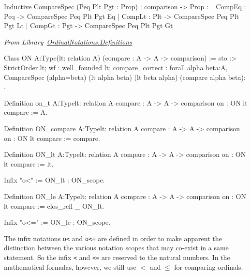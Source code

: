 \begin{Coqsrc}
Inductive CompareSpec (Peq Plt Pgt : Prop) : comparison -> Prop :=
    CompEq : Peq -> CompareSpec Peq Plt Pgt Eq
  | CompLt : Plt -> CompareSpec Peq Plt Pgt Lt
  | CompGt : Pgt -> CompareSpec Peq Plt Pgt Gt
\end{Coqsrc}

\vspace{4pt}
\noindent\emph{From Library~\href{../theories/html/hydras.OrdinalNotations.Definitions.html}{OrdinalNotations.Definitions}}

\label{types:ON}

\begin{Coqsrc}
Class ON {A:Type}(lt: relation A)
      (compare : A -> A -> comparison)  :=
  {
  sto :> StrictOrder lt;
  wf : well_founded lt;
  compare_correct :
    forall alpha beta:A,
      CompareSpec (alpha=beta) (lt alpha beta) (lt beta alpha)
                  (compare alpha beta);
  }.
\end{Coqsrc}

\label{sect:on-lt-notation}
\label{sect:on-le-notation}
\begin{Coqsrc}
Definition on_t  {A:Type}{lt: relation A}
            {compare : A -> A -> comparison}
            {on : ON lt compare} := A.

Definition ON_compare {A:Type}{lt: relation A}
            {compare : A -> A -> comparison}
            {on : ON lt compare} := compare.

Definition ON_lt {A:Type}{lt: relation A}
           {compare : A -> A -> comparison}
           {on : ON lt compare} := lt.

Infix "o<" := ON_lt : ON_scope.

Definition ON_le  {A:Type}{lt: relation A}
           {compare : A -> A -> comparison}
           {on : ON lt compare} :=
  clos_refl _ ON_lt.

Infix "o<=" := ON_le : ON_scope.
\end{Coqsrc}


\begin{remark}
The infix notations \texttt{o<} and \texttt{o<=} are defined in order to make apparent the distinction between the various notation scopes that may co-exist in a same statement. So the infix \texttt{<} and \texttt{<=} are reserved to the natural numbers. In the mathematical formulas, however, we still use $<$ and $\leq$ for comparing ordinals.
\end{remark}


